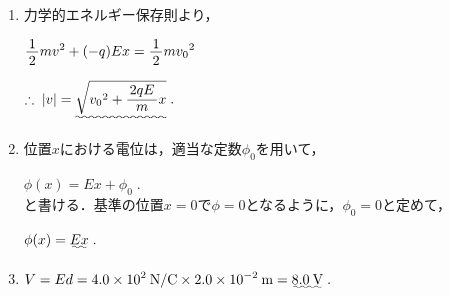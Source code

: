 ﻿\documentclass[../../../ps_a.tex]{subfiles}
\begin{document}
    \begin{enumerate}
        \item%
            力学的エネルギー保存則より，
        
            \myspaceb%
            $\displaystyle
                \myfraca{1}{2}mv^2 + (-q) Ex = \myfraca{1}{2}m{v_0}^2%
            $

            \myspaceb%
            $\displaystyle
                \therefore \; |v|=\uwave{\sqrt{{v_0}^2 + \myfracd{2qE}{m}x}} \;.%
            $
        \item%
            位置$x$における電位は，適当な定数$\phi_0$を用いて，
        
            \myspaceb%
            $\displaystyle
                \phi(x) = Ex + \phi_0 \;.%
            $\\ 
            と書ける．基準の位置$x=0$で$\phi=0$となるように，$\phi_0=0$と定めて，
            
            \myspaceb%
            $\displaystyle
                \phi(x) = \uwave{Ex} \;.%
            $
        \item%
            \myspaceb%
            $\displaystyle
                V = Ed = 4.0 \times 10^2\:\mathrm{N/C}%
                \times 2.0 \times 10^{-2}\:\mathrm{m} = \uwave{8.0\:\mathrm{V}} \;.
            $
    \end{enumerate}
\end{document}
